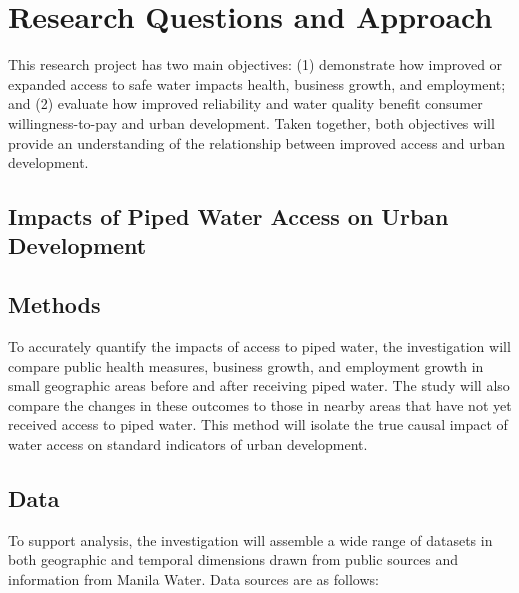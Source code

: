 \documentclass{article}
\begin{document}
\section*{Research Questions and Approach}

This research project has two main objectives: (1) demonstrate how improved or expanded access to safe water impacts health, business growth, and employment; and (2)  evaluate how improved reliability and water quality benefit consumer willingness-to-pay and urban development.  Taken together, both objectives will provide an understanding of the relationship between improved access and urban development.

\subsection{Impacts of Piped Water Access on Urban Development}

\subsection*{Methods}

To accurately quantify the impacts of access to piped water, the investigation will compare public health measures, business growth, and employment growth in small geographic areas before and after receiving piped water.  The study will also compare the changes in these outcomes to those in nearby areas that have not yet received access to piped water.  This method will isolate the true causal impact of water access on standard indicators of urban development.

\subsection*{Data}

To support analysis, the investigation will assemble a wide range of datasets in both geographic and temporal dimensions drawn from public sources and information from Manila Water.   Data sources are as follows:
\end{document}
